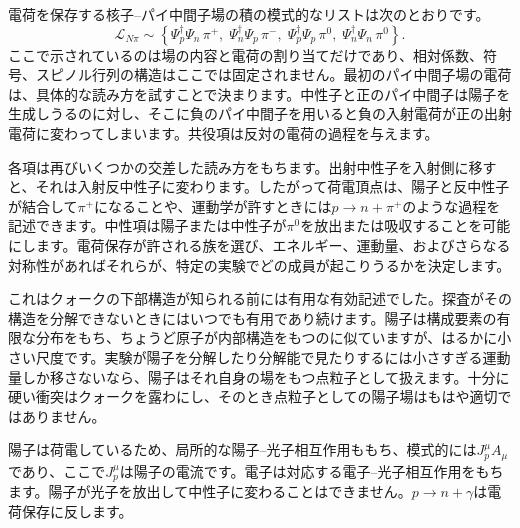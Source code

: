 電荷を保存する核子--パイ中間子場の積の模式的なリストは次のとおりです。
\begin{equation}
\mathcal L_{N\pi}
\sim
\left\{
\Psi_p^\dagger\Psi_n\,\pi^+,\;
\Psi_n^\dagger\Psi_p\,\pi^-,\;
\Psi_p^\dagger\Psi_p\,\pi^0,\;
\Psi_n^\dagger\Psi_n\,\pi^0
\right\}.
\end{equation}
ここで示されているのは場の内容と電荷の割り当てだけであり、相対係数、符号、スピノル行列の構造はここでは固定されません。最初のパイ中間子場の電荷は、具体的な読み方を試すことで決まります。中性子と正のパイ中間子は陽子を生成しうるのに対し、そこに負のパイ中間子を用いると負の入射電荷が正の出射電荷に変わってしまいます。共役項は反対の電荷の過程を与えます。

各項は再びいくつかの交差した読み方をもちます。出射中性子を入射側に移すと、それは入射反中性子に変わります。したがって荷電頂点は、陽子と反中性子が結合して\(\pi^+\)になることや、運動学が許すときには\(p\to n+\pi^+\)のような過程を記述できます。中性項は陽子または中性子が\(\pi^0\)を放出または吸収することを可能にします。電荷保存が許される族を選び、エネルギー、運動量、およびさらなる対称性があればそれらが、特定の実験でどの成員が起こりうるかを決定します。

これはクォークの下部構造が知られる前には有用な有効記述でした。探査がその構造を分解できないときにはいつでも有用であり続けます。陽子は構成要素の有限な分布をもち、ちょうど原子が内部構造をもつのに似ていますが、はるかに小さい尺度です。実験が陽子を分解したり分解能で見たりするには小さすぎる運動量しか移さないなら、陽子はそれ自身の場をもつ点粒子として扱えます。十分に硬い衝突はクォークを露わにし、そのとき点粒子としての陽子場はもはや適切ではありません。

陽子は荷電しているため、局所的な陽子--光子相互作用ももち、模式的には\(J_p^\mu A_\mu\)であり、ここで\(J_p^\mu\)は陽子の電流です。電子は対応する電子--光子相互作用をもちます。陽子が光子を放出して中性子に変わることはできません。\(p\to n+\gamma\)は電荷保存に反します。

\begin{classroomqa}
\end{classroomqa}


